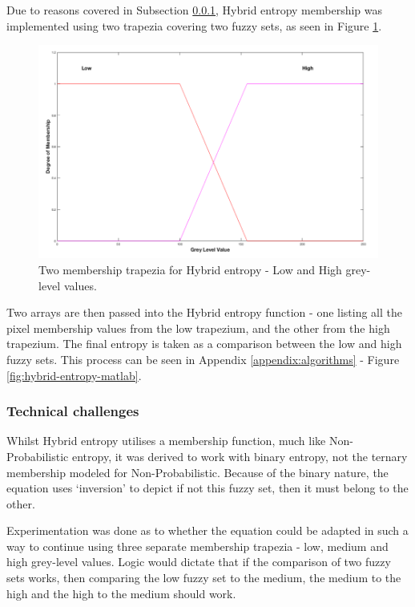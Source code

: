 Due to reasons covered in Subsection \ref{sssec:hyrid-technical}, Hybrid entropy membership was implemented using two trapezia covering two fuzzy sets, as seen in Figure \ref{fig:2-traps}.

\begin{figure}[H]
  \center
  \includegraphics[scale=0.4]{Chapter2/hybrid-img/2_traps.png}
  \caption{Two membership trapezia for Hybrid entropy - Low and High grey-level values.}
  \label{fig:2-traps}
\end{figure}

Two arrays are then passed into the Hybrid entropy function - one listing all the pixel membership values from the low trapezium, and the other from the high trapezium. The final entropy is taken as a comparison between the low and high fuzzy sets. This process can be seen in Appendix \ref{appendix:algorithms} - Figure \ref{fig:hybrid-entropy-matlab}.


\subsubsection{Technical challenges}
\label{sssec:hyrid-technical}

Whilst Hybrid entropy utilises a membership function, much like Non-Probabilistic entropy, it was derived to work with binary entropy, not the ternary membership modeled for Non-Probabilistic. Because of the binary nature, the equation uses `inversion' to depict if not this fuzzy set, then it must belong to the other.

Experimentation was done as to whether the equation could be adapted in such a way to continue using three separate membership trapezia - low, medium and high grey-level values. Logic would dictate that if the comparison of two fuzzy sets works, then comparing the low fuzzy set to the medium, the medium to the high and the high to the medium should work.

